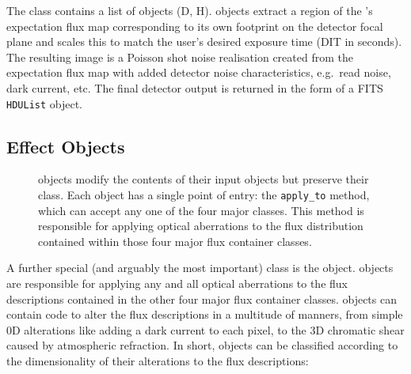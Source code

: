 The \DetectorArray{} class contains a list of \Detector{} objects (D, H).
\Detector{} objects extract a region of the \ImagePlane{}'s expectation flux map corresponding to its own footprint on the detector focal plane and scales this to match the user's desired exposure time (DIT in seconds).
The resulting image is a Poisson shot noise realisation created from the expectation flux map with added detector noise characteristics, e.g.~read noise, dark current, etc.
The final detector output is returned in the form of a FITS \lstinline{HDUList} object.


\subsection{Effect Objects}
\label{effects-objects}

\begin{figure}

\caption{\Effect{} objects modify the contents of their input objects but preserve their class.
Each \Effect{} object has a single point of entry: the \lstinline{apply_to} method, which can accept any one of the four major \ScopeSim{} classes.
This method is responsible for applying optical aberrations to the flux distribution contained within those four major flux container classes.}
\label{fig:effect}

\end{figure}

A further special (and arguably the most important) \ScopeSim{} class is the \Effect{} object.
\Effect{} objects are responsible for applying any and all optical aberrations to the flux descriptions contained in the other four major flux container classes.
\Effect{} objects can contain code to alter the flux descriptions in a multitude of manners, from simple 0D alterations like adding a dark current to each pixel, to the 3D chromatic shear caused by atmospheric refraction.
In short, \Effect{} objects can be classified according to the dimensionality of their alterations to the flux descriptions:

